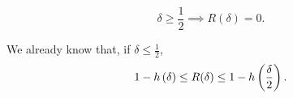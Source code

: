 \begin{thm}
	\begin{equation*}
		\delta \ge \frac{1}{2} \implies R(\delta) = 0.
	\end{equation*}
\end{thm}

We already know that, if $\delta \leq \frac{1}{2}$,
\begin{equation*}
	1 - h\left({\delta}\right) \le R(\delta) \le 1 - h\left({\frac{\delta}{2}}\right).
\end{equation*}

